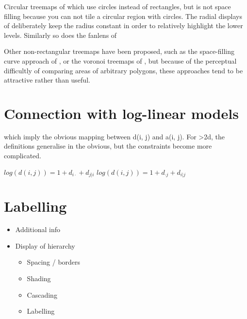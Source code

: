 \documentclass[letterpaper,oneside]{scrartcl}
\begin{document}
Circular treemaps of \citet{wetzel:2008} which use circles instead of rectangles, but is not space filling because you can not tile a circular region with circles. The radial displays of \citet{stasko:2000} deliberately keep the radius constant in order to relatively highlight the lower levels.  Similarly so does the fanlens of \citet{lou:2007}

Other non-rectangular treemaps have been proposed, such as the space-filling curve approach of \citep{wattenberg:2005}, or the voronoi treemaps of \citep{wattenberg:2005}, but because of the perceptual difficultly of comparing areas of arbitrary polygons, these approaches tend to be attractive rather than useful.


\section{Connection with log-linear models}
\label{sec:models}



which imply the obvious mapping between d(i, j) and a(i, j).  For >2d,
the definitions generalise in the obvious, but the constraints become
more complicated.

$log(d(i,j)) = 1 + d_{i \cdot} + d_{j|i}$
$log(d(i,j)) = 1 + d_{\cdot j} + d_{i|j}$

\section{Labelling}
\label{sec:legends}

\begin{itemize}
  \item Additional info 
  
  \item Display of hierarchy
  \begin{itemize}
    \item Spacing / borders
    \item Shading
    \item Cascading
    \item Labelling
  \end{itemize}
\end{itemize}


\end{document}

